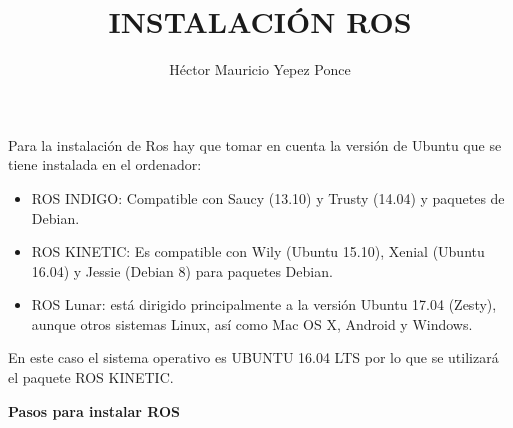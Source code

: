 \documentclass[12pt,a4paper]{article}
\author{Héctor Mauricio Yepez Ponce}
\title{INSTALACIÓN ROS}
\begin{document}
\maketitle

Para la instalación de Ros hay que tomar en cuenta la versión de Ubuntu que se tiene instalada en el ordenador:
\begin{itemize}
\item ROS INDIGO: Compatible con Saucy (13.10) y Trusty (14.04)  y paquetes de Debian. 
\item ROS KINETIC: Es compatible con Wily (Ubuntu 15.10), Xenial (Ubuntu 16.04) y Jessie (Debian 8) para paquetes Debian.
\item ROS Lunar: está dirigido principalmente a la versión Ubuntu 17.04 (Zesty), aunque otros sistemas Linux, así como Mac OS X, Android y Windows.
\end{itemize}
En este caso el sistema operativo es UBUNTU 16.04 LTS por lo que se utilizará el paquete ROS KINETIC.

\begin{center}
\textbf{Pasos para instalar ROS}
\end{center}
\end{document}
